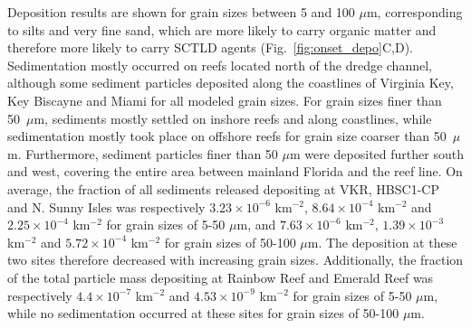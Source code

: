 \documentclass[preprint,12pt,authoryear]{elsarticle}
\begin{document}
Deposition results are shown for grain sizes between 5 and 100 $\mu$m, corresponding to silts and very fine sand, which are more likely to carry organic matter and therefore more likely to carry SCTLD agents \citep{erftemeijer2012environmental}(Fig.~\ref{fig:onset_depo}C,D). Sedimentation mostly occurred on reefs located north of the dredge channel, although some sediment particles deposited along the coastlines of Virginia Key, Key Biscayne and Miami for all modeled grain sizes. For grain sizes finer than 50~$\mu$m, sediments mostly settled on inshore reefs and along coastlines, while sedimentation mostly took place on offshore reefs for grain size coarser than 50~$\mu$m. Furthermore, sediment particles finer than 50 $\mu$m were deposited further south and west, covering the entire area between mainland Florida and the reef line. On average, the fraction of all sediments released depositing at VKR, HBSC1-CP and N. Sunny Isles was respectively $3.23\times10^{-6}$ km$^{-2}$, $8.64\times10^{-4}$ km$^{-2}$ and $2.25\times10^{-4}$ km$^{-2}$ for grain sizes of 5-50 $\mu$m, and $7.63\times10^{-6}$ km$^{-2}$, $1.39\times10^{-3}$ km$^{-2}$ and $5.72\times 10^{-4}$ km$^{-2}$ for grain sizes of 50-100 $\mu$m. The deposition at these two sites therefore decreased with increasing grain sizes. Additionally, the fraction of the total particle mass depositing at Rainbow Reef and Emerald Reef was respectively $4.4\times10^{-7}$ km$^{-2}$ and $4.53\times10^{-9}$ km$^{-2}$ for grain sizes of 5-50 $\mu$m, while no sedimentation occurred at these sites for grain sizes of 50-100 $\mu$m.
\end{document}
